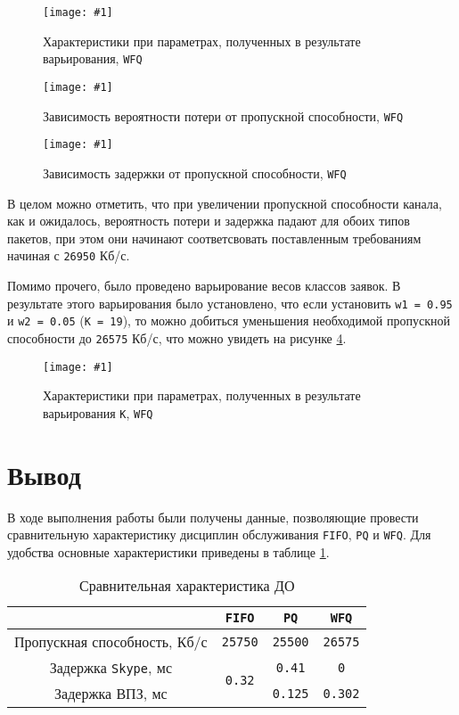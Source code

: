 \documentclass[12pt, a4paper]{article}
\newcommand{\figc}[4]{
  \begin{figure}[H]
  \begin{center}
    \texttt{[image: \#1]}
    \caption{#2}
    \label{fig:#3}
  \end{center}
  \end{figure}
}
\begin{document}
\figc{wfq/C26_95E10WFQ}{Характеристики при параметрах, полученных в результате варьирования, \texttt{WFQ}}{w_c}{1.0}
\figc{charts/wfq_loss}{Зависимость вероятности потери от пропускной способности, \texttt{WFQ}}{w_l}{0.8}
\figc{charts/wfq_delay}{Зависимость задержки от пропускной способности, \texttt{WFQ}}{w_d}{0.8}

В целом можно отметить, что при увеличении пропускной способности канала, как
и ожидалось, вероятность потери и задержка падают для обоих типов пакетов,
при этом они начинают соответсвовать поставленным требованиям начиная с \texttt{26950} Кб/с.

Помимо прочего, было проведено варьирование весов классов заявок. В результате этого варьирования
было установлено, что если установить \texttt{w1 = 0.95} и \texttt{w2 = 0.05} (\texttt{K = 19}),
то можно добиться уменьшения необходимой пропускной способности до \texttt{26575} Кб/с,
что можно увидеть на рисунке \ref{fig:w_k}.

\figc{wfq/C26_575E10WFQ_modified}{Характеристики при параметрах, полученных в результате варьирования \texttt{K}, \texttt{WFQ}}{w_k}{1.0}

\section{Вывод}

В ходе выполнения работы были получены данные, позволяющие провести сравнительную
характеристику дисциплин обслуживания \texttt{FIFO}, \texttt{PQ} и \texttt{WFQ}.
Для удобства основные характеристики приведены в таблице \ref{Tab:res}.

\begin{table}[H]
  \begin{center}
  \caption{Сравнительная характеристика ДО}
  \begin{tabular}{| c | c | c | c |}
    \hline
    & \texttt{FIFO} & \texttt{PQ} & \texttt{WFQ}\\\hline
    Пропускная способность, Кб/с & \texttt{25750} & \texttt{25500} & \texttt{26575}\\\hline
    Задержка \texttt{Skype}, мс & \multirow{2}{*}{\texttt{0.32}} & \texttt{0.41} & \texttt{0}\\
    \cline{1-1} \cline{3-4}
    Задержка ВПЗ, мс & & \texttt{0.125} & \texttt{0.302}\\\hline
  \end{tabular}
  \label{Tab:res}
  \end{center}
\end{table}
\end{document}
